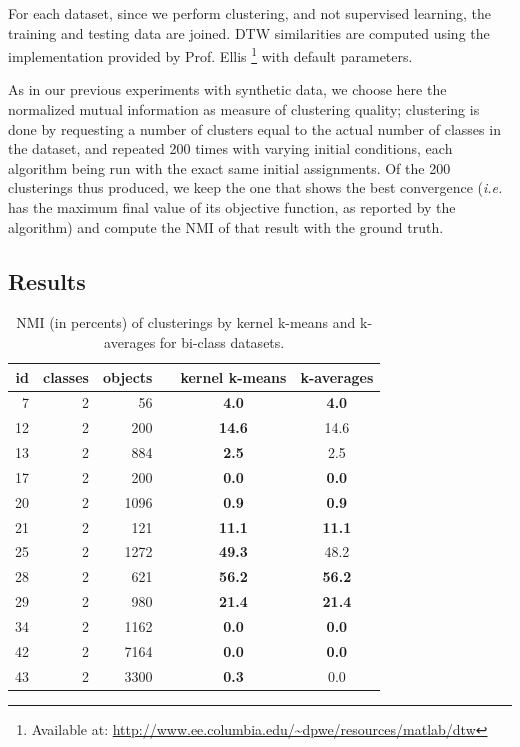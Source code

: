 \documentclass[natbib,smallextended]{svjour3}
\begin{document}
For each dataset, since we perform clustering, and not supervised learning, the training and testing data are joined. DTW similarities are computed using the implementation provided by Prof. Ellis \footnote{Available at: \url{http://www.ee.columbia.edu/~dpwe/resources/matlab/dtw}} with default parameters.

As in our previous experiments with synthetic data, we choose here the normalized mutual information as measure of clustering quality; clustering is done by requesting a number of clusters equal to the actual number of classes in the dataset, and repeated 200 times with varying initial conditions, each algorithm being run with the exact same initial assignments. Of the 200 clusterings thus produced, we keep the one that shows the best convergence (\emph{i.e.} has the maximum final value of its objective function, as reported by the algorithm) and compute the NMI of that result with the ground truth.

\subsection{Results}


\begin{table}
\begin{center}
\caption{NMI (in percents) of clusterings by kernel k-means and k-averages for bi-class datasets.}
\label{tab:results-2}
\begin{tabular}{rrrccc}
id & classes & objects & & kernel k-means & k-averages \\
\hline
 7 & 2 &   56 &  & \textbf{4.0} & \textbf{4.0} \\
12 & 2 &  200 &  & \textbf{14.6} & 14.6 \\
13 & 2 &  884 &  & \textbf{2.5} & 2.5 \\
17 & 2 &  200 &  & \textbf{0.0} & \textbf{0.0} \\
20 & 2 & 1096 &  & \textbf{0.9} & \textbf{0.9} \\
21 & 2 &  121 &  & \textbf{11.1} & \textbf{11.1} \\
25 & 2 & 1272 &  & \textbf{49.3} & 48.2 \\
28 & 2 &  621 &  & \textbf{56.2} & \textbf{56.2} \\
29 & 2 &  980 &  & \textbf{21.4} & \textbf{21.4} \\
34 & 2 & 1162 &  & \textbf{0.0} & \textbf{0.0} \\
42 & 2 & 7164 &  & \textbf{0.0} & \textbf{0.0} \\
43 & 2 & 3300 &  & \textbf{0.3} & 0.0 \\
\end{tabular}
\end{center}
\end{table}
\end{document}
